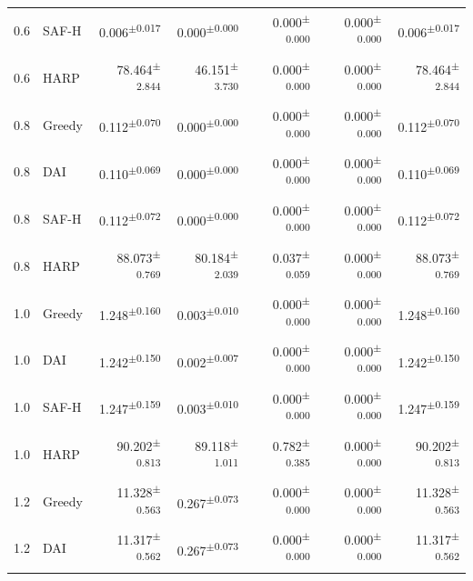 \documentclass[final,5p]{elsarticle}
\begin{document}
\begin{table}[p]
\begin{tabular}{llrrrrr}
0.6 & SAF-H & 0.006\textsuperscript{$\pm$0.017} & 0.000\textsuperscript{$\pm$0.000} & 0.000\textsuperscript{$\pm$0.000} & 0.000\textsuperscript{$\pm$0.000} & 0.006\textsuperscript{$\pm$0.017} \\
0.6 & HARP & 78.464\textsuperscript{$\pm$2.844} & 46.151\textsuperscript{$\pm$3.730} & 0.000\textsuperscript{$\pm$0.000} & 0.000\textsuperscript{$\pm$0.000} & 78.464\textsuperscript{$\pm$2.844} \\
0.8 & Greedy & 0.112\textsuperscript{$\pm$0.070} & 0.000\textsuperscript{$\pm$0.000} & 0.000\textsuperscript{$\pm$0.000} & 0.000\textsuperscript{$\pm$0.000} & 0.112\textsuperscript{$\pm$0.070} \\
0.8 & DAI & 0.110\textsuperscript{$\pm$0.069} & 0.000\textsuperscript{$\pm$0.000} & 0.000\textsuperscript{$\pm$0.000} & 0.000\textsuperscript{$\pm$0.000} & 0.110\textsuperscript{$\pm$0.069} \\
0.8 & SAF-H & 0.112\textsuperscript{$\pm$0.072} & 0.000\textsuperscript{$\pm$0.000} & 0.000\textsuperscript{$\pm$0.000} & 0.000\textsuperscript{$\pm$0.000} & 0.112\textsuperscript{$\pm$0.072} \\
0.8 & HARP & 88.073\textsuperscript{$\pm$0.769} & 80.184\textsuperscript{$\pm$2.039} & 0.037\textsuperscript{$\pm$0.059} & 0.000\textsuperscript{$\pm$0.000} & 88.073\textsuperscript{$\pm$0.769} \\
1.0 & Greedy & 1.248\textsuperscript{$\pm$0.160} & 0.003\textsuperscript{$\pm$0.010} & 0.000\textsuperscript{$\pm$0.000} & 0.000\textsuperscript{$\pm$0.000} & 1.248\textsuperscript{$\pm$0.160} \\
1.0 & DAI & 1.242\textsuperscript{$\pm$0.150} & 0.002\textsuperscript{$\pm$0.007} & 0.000\textsuperscript{$\pm$0.000} & 0.000\textsuperscript{$\pm$0.000} & 1.242\textsuperscript{$\pm$0.150} \\
1.0 & SAF-H & 1.247\textsuperscript{$\pm$0.159} & 0.003\textsuperscript{$\pm$0.010} & 0.000\textsuperscript{$\pm$0.000} & 0.000\textsuperscript{$\pm$0.000} & 1.247\textsuperscript{$\pm$0.159} \\
1.0 & HARP & 90.202\textsuperscript{$\pm$0.813} & 89.118\textsuperscript{$\pm$1.011} & 0.782\textsuperscript{$\pm$0.385} & 0.000\textsuperscript{$\pm$0.000} & 90.202\textsuperscript{$\pm$0.813} \\
1.2 & Greedy & 11.328\textsuperscript{$\pm$0.563} & 0.267\textsuperscript{$\pm$0.073} & 0.000\textsuperscript{$\pm$0.000} & 0.000\textsuperscript{$\pm$0.000} & 11.328\textsuperscript{$\pm$0.563} \\
1.2 & DAI & 11.317\textsuperscript{$\pm$0.562} & 0.267\textsuperscript{$\pm$0.073} & 0.000\textsuperscript{$\pm$0.000} & 0.000\textsuperscript{$\pm$0.000} & 11.317\textsuperscript{$\pm$0.562} \\

\end{tabular}
\end{table}
\end{document}
